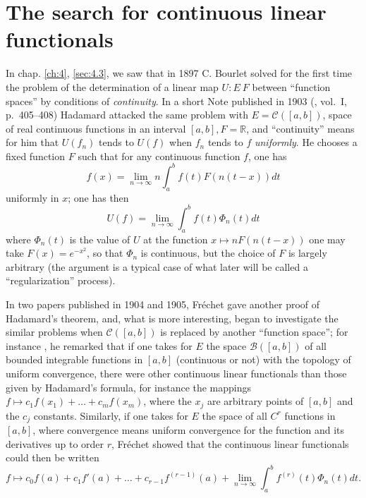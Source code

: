 \documentclass[12pt,a4paper,leqno,twoside]{extbook}
\newcommand{\B}{\mathcal{B}}
\newcommand{\Cont}{\mathcal{C}}
\newcommand{\R}{\mathbb{R}}
\begin{document}
\section{The search for continuous linear functionals}
\label{sec:6.1}

In chap. \ref{ch:4}, \ref{sec:4.3}, we saw that in 1897 C. Bourlet solved for the first time the problem of the determination of a linear map \(U: E \ F\) between ``function spaces'' by conditions of \emph{continuity}. In a short Note published in 1903 (\cite{094}, vol.~I, p.~405--408) Hadamard attacked the same problem with \(E = \Cont([a,b])\), space of real continuous functions in an interval \([a,b], F = \R\), and ``continuity'' means for him that \(U(f_n)\) tends to \(U(f)\) when \(f_n\) tends to \(f\) \emph{uniformly}. He chooses a fixed function \(F\) such that for any continuous function \(f\), one has
\begin{equation}
    \label{eq:6.1}
    f(x) = \lim_{n \to \infty} n \int_a^b f(t) F(n(t-x)) dt
\end{equation}
uniformly in \(x\); one has then
\begin{equation}
    \label{eq:6.2}
    U(f) = \lim_{n \to \infty} \int_a^b f(t) \Phi_n(t) dt
\end{equation}
where \(\Phi_n(t)\) is the value of \(U\) at the function \(x \mapsto nF(n(t-x))\) one may take \(F(x) = e^{-x^2}\), so that \(\Phi_n\) is continuous, but the choice of \(F\) is largely arbitrary (the argument is a typical case of what later will be called a ``regularization'' process).

In two papers published in 1904 and 1905, Fréchet gave another proof of Hadamard's theorem, and, what is more interesting, began to investigate the similar problems when \(\Cont([a,b])\) is replaced by another ``function space''; for instance \cite{070}, he remarked that if one takes for \(E\) the space \(\B([a,b])\) of all bounded integrable functions in \([a,b]\) (continuous or not) with the topology of uniform convergence, there were other continuous linear functionals than those given by Hadamard's formula, for instance the mappings \(f \mapsto c_1 f(x_1) + \ldots + c_m f(x_m)\), where the \(x_j\) are arbitrary points of \([a,b]\) and the \(c_j\) constants. Similarly, if one takes for \(E\) the space of all \(C^r\) functions in \([a,b]\), where convergence means uniform convergence for the function and its derivatives up to order \(r\), Fréchet showed that the continuous linear functionals could then be written
\[
    f \mapsto c_0 f(a) + c_1 f'(a) + \ldots + c_{r-1}f^{(r-1)}(a) + \lim_{n \to \infty} \int_a^b f^{(r)}(t) \Phi_n(t)dt.
\]
\end{document}
